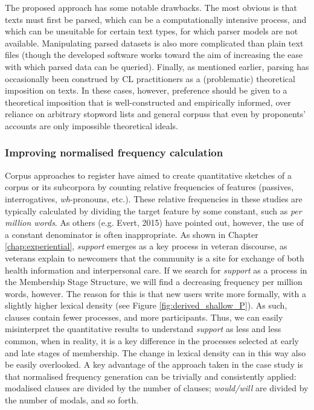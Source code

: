 The proposed approach has some notable drawbacks. The most obvious is that texts must first be parsed, which can be a computationally intensive process, and which can be unsuitable for certain text types, for which parser models are not available. Manipulating parsed datasets is also more complicated than plain text files (though the developed software works toward the aim of increasing the ease with which parsed data can be queried). Finally, as mentioned earlier, parsing has occasionally been construed by \gls{CL} practitioners as a (problematic) theoretical imposition on texts. In these cases, however, preference should be given to a theoretical imposition that is well\hyp{}constructed and empirically informed, over reliance on arbitrary stopword lists and general \glspl{corpus} that even by proponents' accounts \cite[e.g.]{baker_acceptable_2012} are only impossible theoretical ideals.

\subsubsection{Improving normalised frequency calculation}


Corpus approaches to register \cite[including much of Biber's work, e.g.][]{biber_quantitative_2001,biber_register_2012} have aimed to create quantitative sketches of a \gls{corpus} or its subcorpora by counting relative frequencies of  features (passives, interrogatives, \emph{wh}\hyp{}pronouns, etc.). These relative frequencies in these studies are typically calculated by dividing the target feature by some constant, such as \emph{per million words}. As others (e.g. Evert, 2015) have pointed out, however, the use of a constant denominator is often inappropriate. As shown in Chapter \ref{chap:experiential}, \emph{support} emerges as a key process in veteran discourse, as veterans explain to newcomers that the community is a site for exchange of both health information and interpersonal care. If we search for \emph{support} as a process in the Membership Stage Structure, we will find a decreasing frequency per million words, however. The reason for this is that new users write more formally, with a slightly higher lexical density (see Figure \ref{fig:derived_shallow_P}). As such, clauses contain fewer processes, and more participants. Thus, we can easily misinterpret the quantitative results to understand \emph{support} as less and less common, when in reality, it is a key difference in the processes selected at early and late stages of membership. The change in lexical density can in this way also be easily overlooked. A key advantage of the approach taken in the case study is that normalised frequency generation can be trivially and consistently applied: modalised clauses are divided by the number of clauses; \emph{would\slash will} are divided by the number of modals, and so forth.

